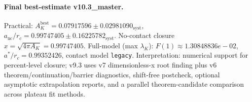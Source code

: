 \paragraph{Final best-estimate v10.3_master.}
Practical: $A_K^{\mathrm{best}} = 0.07917596 \pm 0.02981090_{\mathrm{syst}}$, $a_{\mathrm{nc}}/r_c = 0.99747405 \pm 0.16225782_{\mathrm{syst}}$.
No-contact closure $x = \sqrt{4\pi A_K} = 0.99747405$.
Full-model (max $\lambda_K$): $F(1) \approx 1.30848836e-02$, $a^*/r_c = 0.99352426$, contact model \texttt{legacy}.
Interpretation: numerical support for percent-level closure; v9.3 uses v7 dimensionless-x root finding plus v6 theorem/continuation/barrier diagnostics, shift-free postcheck, optional asymptotic extrapolation reports, and a parallel theorem-candidate comparison across plateau fit methods.
